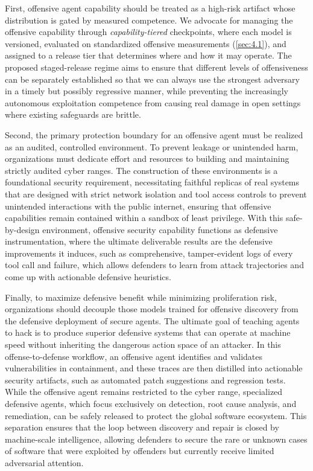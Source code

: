 \documentclass{article}
\theoremstyle{plain}
\theoremstyle{definition}
\theoremstyle{remark}
\begin{document}
First, offensive agent capability should be treated as a high-risk artifact whose distribution is gated by measured competence. We advocate for managing the offensive capability through \textit{capability-tiered} checkpoints, where each model is versioned, evaluated on standardized offensive measurements (\autoref{sec:4.1}), and assigned to a release tier that determines where and how it may operate. The proposed staged-release regime aims to ensure that different levels of offensiveness can be separately established so that we can always use the strongest adversary in a timely but possibly regressive manner, while preventing the increasingly autonomous exploitation competence from causing real damage in open settings where existing safeguards are brittle.

Second, the primary protection boundary for an offensive agent must be realized as an audited, controlled environment. To prevent leakage or unintended harm, organizations must dedicate effort and resources to building and maintaining strictly audited cyber ranges. The construction of these environments is a foundational security requirement, necessitating faithful replicas of real systems that are designed with strict network isolation and tool access controls to prevent unintended interactions with the public internet, ensuring that offensive capabilities remain contained within a sandbox of least privilege. With this safe-by-design environment, offensive security capability functions as defensive instrumentation, where the ultimate deliverable results are the defensive improvements it induces, such as comprehensive, tamper-evident logs of every tool call and failure, which allows defenders to learn from attack trajectories and come up with actionable defensive heuristics.

Finally, to maximize defensive benefit while minimizing proliferation risk, organizations should decouple those models trained for offensive discovery from the defensive deployment of secure agents. The ultimate goal of teaching agents to hack is to produce superior defensive systems that can operate at machine speed without inheriting the dangerous action space of an attacker. In this offense-to-defense workflow, an offensive agent identifies and validates vulnerabilities in containment, and these traces are then distilled into actionable security artifacts, such as automated patch suggestions and regression tests. While the offensive agent remains restricted to the cyber range, specialized defensive agents, which focus exclusively on detection, root cause analysis, and remediation, can be safely released to protect the global software ecosystem. This separation ensures that the loop between discovery and repair is closed by machine-scale intelligence, allowing defenders to secure the rare or unknown cases of software that were exploited by offenders but currently receive limited adversarial attention.
\end{document}
